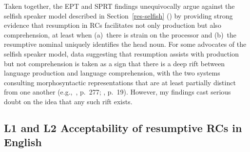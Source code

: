 Taken together, the EPT and SPRT findings unequivocally argue against the selfish speaker model described in Section~\ref{res-selfish} (\cite{ferreira.swets2005,heestand.etal2011,morgan.etal2020,polinsky.etal2013}) by providing strong evidence that resumption in RCs facilitates not only production but also comprehension, at least when (a)~there is strain on the processor and (b)~the resumptive nominal uniquely identifies the head noun. For some advocates of the selfish speaker model, data suggesting that resumption assists with production but not comprehension is taken as a sign that there is a deep rift between language production and language comprehension, with the two systems consulting morphosyntactic representations that are at least partially distinct from one another (e.g.,~\cite{ferreira.swets2005}, p.~277; \cite{morgan.etal2020}, p.~19). However, my findings cast serious doubt on the idea that any such rift exists. 


\subsection{L1 and L2 Acceptability of resumptive RCs in English}\label{dis-acceptability}

